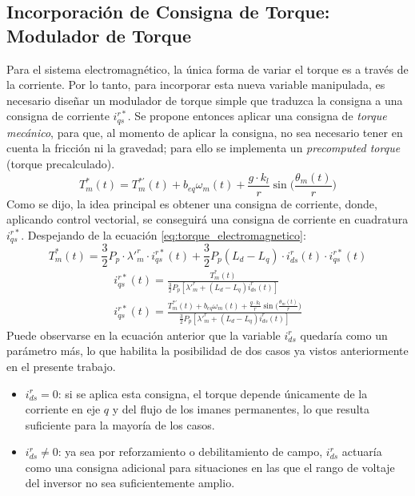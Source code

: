 \documentclass[12pt, a4paper,journal, onecolumn, compsoc]{IEEEtran}
\begin{document}
\subsection{Incorporación de Consigna de Torque: Modulador de Torque}
Para el sistema electromagnético, la única forma de variar el torque es a través de la corriente. Por lo tanto, para incorporar esta nueva variable manipulada, es necesario diseñar un modulador de torque simple que traduzca la consigna a una consigna de corriente $i_{qs}^{r*}$. Se propone entonces aplicar una consigna de \textit{torque mecánico}, para que, al momento de aplicar la consigna, no sea necesario tener en cuenta la fricción ni la gravedad; para ello se implementa un \textit{precomputed torque} (torque precalculado).
\begin{equation}
    T_m^{\ast}(t) = T_m^{\ast\prime}(t) + b_{eq}\omega_m(t) + \frac{g\cdot k_l}{r}\sin{\Bigg( \frac{\theta_m(t)}{r}\Bigg)}
\end{equation}
Como se dijo, la idea principal es obtener una consigna de corriente, donde, aplicando control vectorial, se conseguirá una consigna de corriente en cuadratura $i_{qs}^{r*}$. Despejando de la ecuación \eqref{eq:torque_electromagnetico}:
    \begin{equation*}
            T_m^*(t) = \frac{3}{2} P_p \cdot \lambda'^r_m \cdot i^{r*}_{qs}(t) + \frac{3}{2} P_p (L_d-L_q)\cdot i^r_{ds}(t)\cdot i^{r*}_{qs}(t)
    \end{equation*}
\begin{gather*}
i_{qs}^{r*}(t)=
\frac{T_m^*(t)}
{\frac{3}{2}P_p\left[\lambda'^r_m+(L_d-L_q)i_{ds}^{r}(t)\right]} \\
i_{qs}^{r*}(t)= \frac{T_m^{\ast\prime}(t) + b_{eq}\omega_m(t) + \frac{g\cdot k_l}{r}\sin{\Big( \frac{\theta_m(t)}{r}\Big)}}{\frac{3}{2}P_p\left[\lambda'^r_m+(L_d-L_q)i_{ds}^{r}(t)\right]}
\end{gather*}
Puede observarse en la ecuación anterior que la variable $i_{ds}^r$ quedaría como un parámetro más, lo que habilita la posibilidad de dos casos ya vistos anteriormente en el presente trabajo.
\begin{itemize}
    \item $i_{ds}^r = 0$: si se aplica esta consigna, el torque depende únicamente de la corriente en eje $q$ y del flujo de los imanes permanentes, lo que resulta suficiente para la mayoría de los casos.
    \item $i_{ds}^r \neq 0$: ya sea por reforzamiento o debilitamiento de campo, $i_{ds}^r$ actuaría como una consigna adicional para situaciones en las que el rango de voltaje del inversor no sea suficientemente amplio.
\end{itemize}
\end{document}
